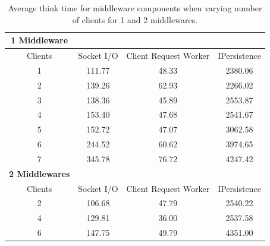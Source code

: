 \documentclass{article}
\begin{document}
            \begin{table}
            
            \begin{tabular}{|c|c|c|c|}
            \hline
            \textbf{1 Middleware} & & &\\
            \hline
            Clients & Socket I/O & Client Request Worker & IPersistence \\ \hline
            1&  111.77 &    48.33 &  2380.06\\ \hline  
 2& 139.26 &    62.93 &  2266.02\\ \hline  
 3& 138.36 &    45.89 &  2553.87\\ \hline  
 4& 153.40 &    47.68 &  2541.67\\ \hline  
 5& 152.72 &    47.07 &  3062.58\\ \hline  
 6& 244.52 &    60.62 &  3974.65\\ \hline  
 7& 345.78 &    76.72 &  4247.42\\ \hline    
            \textbf{2 Middlewares} & & & \\  
                \hline
                Clients &   Socket I/O & Client Request Worker & IPersistence \\ \hline
 2& 106.68 &    47.79 &  2540.22\\ \hline  
 4& 129.81 &    36.00 &  2537.58\\ \hline  
 6& 147.75 &    49.79 &  4351.00\\ \hline  
            \end{tabular}
            \caption{Average think time for middleware components when varying number of clients for 1 and 2 middlewares.}
            \label{table:thinktime_middleware_clients}
            \end{table}                
            
\end{document}
